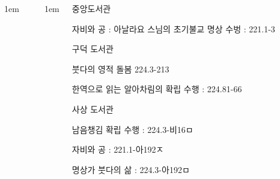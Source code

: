 \documentclass[	20pt, 
							a1paper, 
							portrait, %
							margin=0mm, %
							innermargin=10mm,  		%
							colspace=5mm, 
							subcolspace=0mm
							]{tikzposter}
\begin{document}
\begin{columns}
			{
					\setlength{\leftmargini}{4em}
					\setlength{\labelsep} {1em}
				\begin{LARGE}



				\end{LARGE}
			} %

			{
					\setlength{\leftmargini}{4em}
					\setlength{\labelsep} {1em}
				\begin{LARGE}

중앙도서관

자비와 공 : 아날라요 스님의 초기불교 명상 수벙 : 221.1-3

구덕 도서관

붓다의 영적 돌봄 224.3-213

한역으로 읽는 알아차림의 확립 수행 : 224.81-66

사상 도서관

남음챙김 확립 수행 : 224.3-비16ㅁ

자비와 공 : 221.1-아192ㅈ

명상가 붓다의 삶 : 224.3-아192ㅁ

				\end{LARGE}
			} %




	\end{columns}
\end{document}
